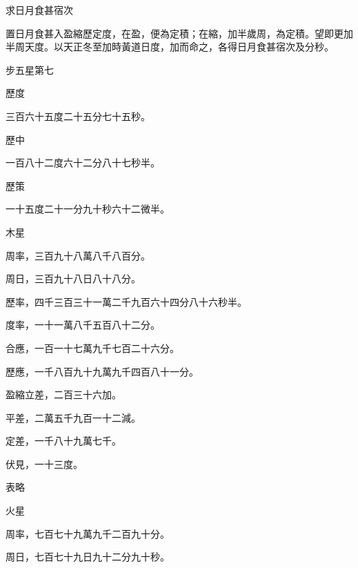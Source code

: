 \begin{pinyinscope}
 求日月食甚宿次



 置日月食甚入盈縮歷定度，在盈，便為定積；在縮，加半歲周，為定積。望即更加半周天度。以天正冬至加時黃道日度，加而命之，各得日月食甚宿次及分秒。



 步五星第七



 歷度



 三百六十五度二十五分七十五秒。



 歷中



 一百八十二度六十二分八十七秒半。



 歷策



 一十五度二十一分九十秒六十二微半。



 木星



 周率，三百九十八萬八千八百分。



 周日，三百九十八日八十八分。



 歷率，四千三百三十一萬二千九百六十四分八十六秒半。



 度率，一十一萬八千五百八十二分。



 合應，一百一十七萬九千七百二十六分。



 歷應，一千八百九十九萬九千四百八十一分。



 盈縮立差，二百三十六加。



 平差，二萬五千九百一十二減。



 定差，一千八十九萬七千。



 伏見，一十三度。



 表略



 火星



 周率，七百七十九萬九千二百九十分。



 周日，七百七十九日九十二分九十秒。




\end{pinyinscope}
